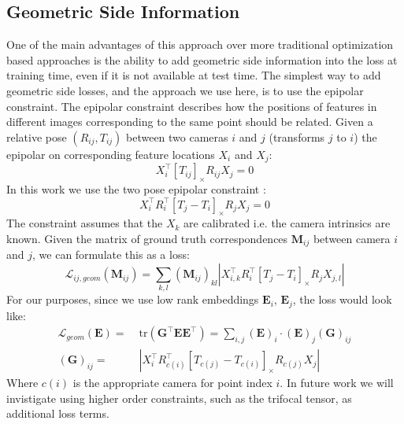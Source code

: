 \documentclass[10pt,twocolumn,letterpaper]{article}
\newcommand{\mat}[1]{\mathbf{#1}}
\newcommand{\cross}[1]{[#1]_{\times}}
\begin{document}
\subsection{Geometric Side Information}
One of the main advantages of this approach over more traditional optimization based approaches is the ability to add geometric side information into the loss at training time, even if it is not available at test time.
The simplest way to add geometric side losses, and the approach we use here, is to use the epipolar constraint.
The epipolar constraint describes how the positions of features in different images corresponding to the same point should be related.
Given a relative pose $(R_{ij}, T_{ij})$ between two cameras $i$ and $j$  (transforms $j$ to $i$) the epipolar on corresponding feature locations $X_i$ and $X_j$:
\begin{equation}
X_{i}^\top \cross{T_{ij}}R_{ij} X_{j} = 0
\label{eq:essential_constraint_rel}
\end{equation}
In this work we use the two pose epipolar constraint \cite{tron2014quotient}:
\begin{equation}
X_{i}^\top R_{i}^\top \cross{T_{j} - T_{i}}R_{j} X_{j} = 0
\label{eq:essential_constraint}
\end{equation}
The constraint assumes that the $X_k$ are calibrated i.e. the camera intrinsics are known. 
Given the matrix of ground truth correspondences $\mat{M}_{ij}$ between camera $i$ and $j$, we can formulate this as a loss:
\begin{equation}
\mathcal{L}_{ij,geom}(\mat{M}_{ij}) = \sum_{k,l} (\mat{M}_{ij})_{kl} \left|X_{i,k}^\top R_{i}^\top \cross{T_{j} - T_{i}}R_{j} X_{j,l}\right|
\label{eq:geom_cost}
\end{equation}
For our purposes, since we use low rank embeddings $\mat{E}_{i}$, $\mat{E}_{j}$, the loss would look like:
\begin{align}
\mathcal{L}_{geom}(\mat{E})
=&\; \mathrm{tr}(\mat{G}^\top \mat{E}\mat{E}^\top) = \sum_{i,j} (\mat{E})_{i} \cdot (\mat{E})_{j} (\mat{G})_{ij} \\
(\mat{G})_{ij} =&\; \left|X_{i}^\top R_{c(i)}^\top \cross{T_{c(j)} - T_{c(i)}}R_{c(j)} X_{j}\right| \nonumber
\label{eq:geom_cost2}
\end{align}
Where $c(i)$ is the appropriate camera for point index $i$.
In future work we will invistigate using higher order constraints, such as the trifocal tensor, as additional loss terms.
\end{document}
